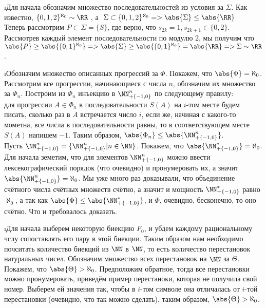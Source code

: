 \i Для начала обозначим множество последовательностей из условия за $\Sigma$. Как известно, $\{0, 1, 2\}^{\aleph_0} \sim \RR \ $, а $\ \Sigma \subset \{0, 1, 2\}^{\aleph_0} => \abs{\Sigma} \leq \abs{\RR}$\\
Теперь рассмотрим $P \subset \Sigma = \{S\}$, где верно, что $s_{2k} = 1, s_{2k+1} \in \{0, 2\}$. Рассмотрев каждый элемент последовательности по модулю 2, мы получим что $\abs{P} \geq \abs{\{0, 1\}^{\aleph_0}} => \abs{\Sigma} \geq \abs{\{0, 1\}^{\aleph_0}} = \abs{\RR} => \Sigma \sim \RR$.

\i Обозначим множество описанных прогрессий за $\Phi$. Покажем, что $\abs{\Phi} = \aleph_0$.\\
Рассмотрим все прогрессии, начинающиеся с числа $n$, обозначим их множество за $\Phi_n$. Построим
из $\Phi_n$ инъекцию в $\NN_{+\{-1, 0\}}^n$ по следующему правилу:\\
для прогрессии $A \in \Phi_n$ в последовательности $S(A)$ на $i$-том месте будем писать, сколько раз в $A$ встречается число $i$, если же, начиная с какого-то мометна, все числа в последовательности равны, то в соответствующем месте $S(A)$ напишем $-1$. Таким образом, $\abs{\Phi_n} \leq \abs{\NN_{+\{-1, 0\}}^n}$.\\
Пусть $\NN_{+\{-1, 0\}}^\ast = \{\NN_{+\{-1, 0\}}^n| n\in\NN\}$. Покажем, что $\abs{\NN_{+\{-1, 0\}}^\ast} = \aleph_0$.  Для начала земетим, что для элементов $\NN_{+\{-1, 0\}}^n$ можно ввести лексекографический порядок (что очевидно) и пронумеровать их, а значит $\abs{\NN_{+\{-1, 0\}}^n} = \aleph_0$. Мы уже много раз доказывали, что объединение счётного числа счётных множеств счётно, а значит и мощность $\NN_{+\{-1, 0\}}^\ast$ равно $\aleph_0$, а так как $\abs{\Phi} \leq \abs{\NN_{+\{-1, 0\}}^\ast}$, и $\Phi$, очевидно, бесконечно, то оно счётно. Что и требовалось доказать.

\i Для начала выберем некоторую биекцию $F_0$, и убдем каждому рациональному чслу сопоставлять его пару в этой биекции. Таким образом нам необходимо почситать количество биекций из $\NN$ в $\NN$, то есть количество перестановок натуральных чисел. Обозначим множество всех перестановок на $\NN$ за $\Theta$. Покажем, что $\abs{\Theta} > \aleph_0$. Предположим обратное, тогда все перестановки можно пронумеровать, приведём пример перестаноки, которая не получила свой номер. Выберем ей значения так, чтобы в $i$-том символе она отличалась от $i$-той перестановки (очевидно, что так можно сделать), таким образом, $\abs{\Theta} > \aleph_0$. 

